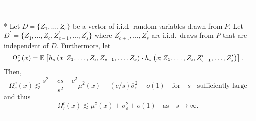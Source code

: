 \hrule

\begin{lem}\label{lem:omega_sc}\mbox{}\\*
	Let $D = \{Z_1, \dotsc, Z_{s}\}$ be a vector of i.i.d.\ random variables drawn from $P$.
	Let $D^{\prime} = \{Z_1, \dotsc, Z_{c}, Z_{c+1}^{\prime}, \dotsc,  Z_{s}^{\prime}\}$ where $Z_{c+1}^{\prime}, \dotsc,  Z_{s}^{\prime}$ are i.i.d.\ draws from $P$ that are independent of $D$.
	Furthermore, let
	\begin{equation}
		\Omega_{s}^{c}\left(x\right)
		= \mathbb{E}\left[h_{s}\left(x; Z_1, \ldots, Z_{c}, Z_{c+1}, \ldots, Z_{s}\right) \cdot
			h_{s}\left(x; Z_1, \ldots,Z_{c}, Z_{c+1}^{\prime}, \ldots, Z_{s}^{\prime}\right)\right].
	\end{equation}
	Then,
	\begin{equation}
		\Omega_{s}^{c}\left(x\right)
		\lesssim \frac{s^2 + cs  - c^2}{s^2} \mu^2(x) + (c/s) \overline{\sigma}_{\varepsilon}^2 + o(1)
		\quad \text{for} \quad s \quad \text{sufficiently large}
	\end{equation}
	and thus
	\begin{equation}
		\Omega_{s}^{c}\left(x\right)
		\lesssim \mu^2(x) + \overline{\sigma}_{\varepsilon}^2 + o(1)
		\quad \text{as} \quad s \rightarrow \infty.
	\end{equation}
\end{lem}
\hrule
